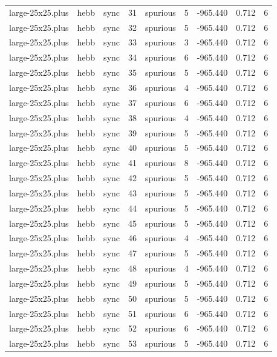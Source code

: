 \begin{tabular}{lllrlrrrr}
large-25x25.plus & hebb & sync & 31 & spurious & 5 & -965.440 & 0.712 & 6 \\
large-25x25.plus & hebb & sync & 32 & spurious & 5 & -965.440 & 0.712 & 6 \\
large-25x25.plus & hebb & sync & 33 & spurious & 3 & -965.440 & 0.712 & 6 \\
large-25x25.plus & hebb & sync & 34 & spurious & 6 & -965.440 & 0.712 & 6 \\
large-25x25.plus & hebb & sync & 35 & spurious & 5 & -965.440 & 0.712 & 6 \\
large-25x25.plus & hebb & sync & 36 & spurious & 4 & -965.440 & 0.712 & 6 \\
large-25x25.plus & hebb & sync & 37 & spurious & 6 & -965.440 & 0.712 & 6 \\
large-25x25.plus & hebb & sync & 38 & spurious & 4 & -965.440 & 0.712 & 6 \\
large-25x25.plus & hebb & sync & 39 & spurious & 5 & -965.440 & 0.712 & 6 \\
large-25x25.plus & hebb & sync & 40 & spurious & 5 & -965.440 & 0.712 & 6 \\
large-25x25.plus & hebb & sync & 41 & spurious & 8 & -965.440 & 0.712 & 6 \\
large-25x25.plus & hebb & sync & 42 & spurious & 5 & -965.440 & 0.712 & 6 \\
large-25x25.plus & hebb & sync & 43 & spurious & 5 & -965.440 & 0.712 & 6 \\
large-25x25.plus & hebb & sync & 44 & spurious & 5 & -965.440 & 0.712 & 6 \\
large-25x25.plus & hebb & sync & 45 & spurious & 5 & -965.440 & 0.712 & 6 \\
large-25x25.plus & hebb & sync & 46 & spurious & 4 & -965.440 & 0.712 & 6 \\
large-25x25.plus & hebb & sync & 47 & spurious & 5 & -965.440 & 0.712 & 6 \\
large-25x25.plus & hebb & sync & 48 & spurious & 4 & -965.440 & 0.712 & 6 \\
large-25x25.plus & hebb & sync & 49 & spurious & 5 & -965.440 & 0.712 & 6 \\
large-25x25.plus & hebb & sync & 50 & spurious & 5 & -965.440 & 0.712 & 6 \\
large-25x25.plus & hebb & sync & 51 & spurious & 6 & -965.440 & 0.712 & 6 \\
large-25x25.plus & hebb & sync & 52 & spurious & 6 & -965.440 & 0.712 & 6 \\
large-25x25.plus & hebb & sync & 53 & spurious & 5 & -965.440 & 0.712 & 6 \\

\end{tabular}
